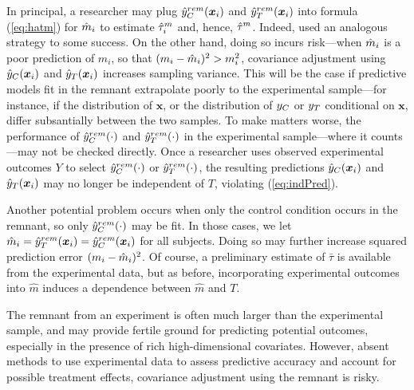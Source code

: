 In principal, a researcher may plug $\hat{y}_C^{rem}(\bm{x}_i)$ and $\hat{y}_T^{rem}(\bm{x}_i)$ into formula
(\ref{eq:hatm}) for $\hat{m}_i$ to estimate $\hat{\tau}_i^m$ and, hence, $\hat{\tau}^m$.
Indeed, \citet{rebarEDM} used an analogous strategy to some success.
On the other hand, doing so incurs risk---when $\hat{m}_i$ is a poor
prediction of $m_i$, so that $(m_i-\hat{m}_i)^2>m_i^2$, covariance
adjustment using $\hat{y}_C(\bm{x}_i)$ and $\hat{y}_T(\bm{x}_i)$ increases sampling variance.
This will be the case if predictive models fit in the remnant
extrapolate poorly to the experimental sample---for instance, if the
distribution of $\bm{x}$, or the distribution of $y_C$ or $y_T$
conditional on $\bm{x}$, differ subsantially between the two samples.
To make matters worse, the performance of $\hat{y}_C^{rem}(\cdot)$ and $\hat{y}_T^{rem}(\cdot)$ in the
experimental sample---where it counts---may not be checked directly.
Once a researcher uses observed experimental outcomes $Y$ to select
$\hat{y}_C^{rem}(\cdot)$ or $\hat{y}_T^{rem}(\cdot)$, the resulting predictions $\hat{y}_C(\bm{x}_i)$ and
$\hat{y}_T(\bm{x}_i)$ may no longer be independent of $T$, violating
(\ref{eq:indPred}).

Another potential problem occurs when only the control condition
occurs in the remnant, so only $\hat{y}_C^{rem}(\cdot)$ may be fit.
In those cases, we let $\hat{m}_i=\hat{y}_T^{rem}(\bm{x}_i)=\hat{y}_C^{rem}(\bm{x}_i)$ for all subjects.
Doing so may further increase squared prediction error $(m_i-\hat{m}_i)^2$.
Of course, a preliminary estimate of $\bar{\tau}$ is available from
the experimental data, but as before, incorporating experimental
outcomes into $\hat{m}$ induces a dependence between $\hat{m}$ and
$T$.

The remnant from an experiment is often much larger than the
experimental sample, and may provide fertile ground for predicting
potential outcomes, especially in the presence of rich
high-dimensional covariates.
However, absent methods to use experimental data to assess predictive
accuracy and account for possible treatment effects, covariance
adjustment using the remnant is risky.
